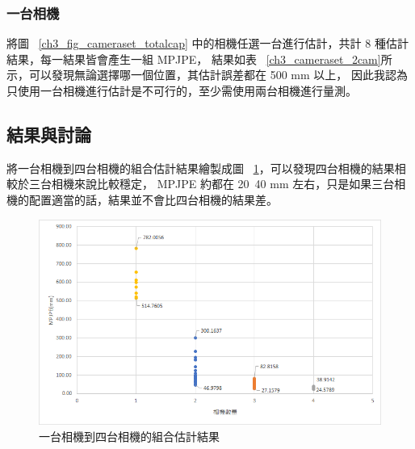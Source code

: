 \subsubsection{一台相機}
將圖 ~\ref{ch3_fig_cameraset_totalcap} 中的相機任選一台進行估計，共計 8 種估計結果，每一結果皆會產生一組 MPJPE，
結果如表 ~\ref{ch3_cameraset_2cam}所示，可以發現無論選擇哪一個位置，其估計誤差都在 500 mm 以上，
因此我認為只使用一台相機進行估計是不可行的，至少需使用兩台相機進行量測。
\begin{table}[!ht]
   \caption[一台相機組合與其估計結果誤差]{一台相機組合與其估計結果誤差}
   \centering
   \label{ch3_cameraset_1cam}
   \setlength{\tabcolsep}{3pt}
   \renewcommand\arraystretch{1.5}
\end{table}

\subsection{結果與討論}
將一台相機到四台相機的組合估計結果繪製成圖 ~\ref{ch3_fig_1.2.3.4cam}，可以發現四台相機的結果相較於三台相機來說比較穩定，
MPJPE 約都在 20~40 mm 左右，只是如果三台相機的配置適當的話，結果並不會比四台相機的結果差。
\begin{figure}[!ht]
   \centering
   \includegraphics[width=12cm]{figure/ch3_fig_1.2.3.4cam.png}
   \caption[一台相機到四台相機的組合估計結果]{一台相機到四台相機的組合估計結果}
   \label{ch3_fig_1.2.3.4cam}
\end{figure}

